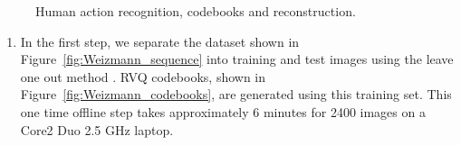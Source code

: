 \documentclass[12pt,letterpaper,doublespaced,ETD]{gt-ece-thesis} %
\begin{document}
\begin{Body}
\begin{figure}
						\hspace{1in}
						\caption{Human action recognition, codebooks and reconstruction.} 
						\label{fig:Weizmann_codebooks_and_reconstruction}				
			\end{figure}
			
\begin{enumerate}			
\item In the first step, we separate the dataset shown in Figure~\ref{fig:Weizmann_sequence} into training and test images using the leave one out method \cite{2000_JNL_SURVEYprml_Jain}.  RVQ codebooks, shown in Figure~\ref{fig:Weizmann_codebooks}, are generated using this training set.  This one time offline step takes approximately 6 minutes for 2400 images on a Core2 Duo 2.5 GHz laptop.  


\end{enumerate}
\end{Body}
\end{document}

